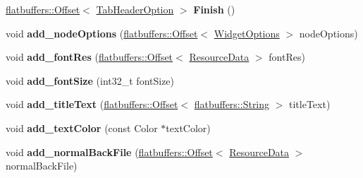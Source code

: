 \begin{DoxyCompactItemize}
\hyperlink{structflatbuffers_1_1Offset}{flatbuffers\+::\+Offset}$<$ \hyperlink{structflatbuffers_1_1TabHeaderOption}{Tab\+Header\+Option} $>$ {\bfseries Finish} ()
\item 
\mbox{\label{structflatbuffers_1_1TabHeaderOptionBuilder_a71c19a789a8634526b654c400526f1ab}} 
void {\bfseries add\+\_\+node\+Options} (\hyperlink{structflatbuffers_1_1Offset}{flatbuffers\+::\+Offset}$<$ \hyperlink{structflatbuffers_1_1WidgetOptions}{Widget\+Options} $>$ node\+Options)
\item 
\mbox{\label{structflatbuffers_1_1TabHeaderOptionBuilder_ab0c86298f95e9cb79e4e2a4505b5f829}} 
void {\bfseries add\+\_\+font\+Res} (\hyperlink{structflatbuffers_1_1Offset}{flatbuffers\+::\+Offset}$<$ \hyperlink{structflatbuffers_1_1ResourceData}{Resource\+Data} $>$ font\+Res)
\item 
\mbox{\label{structflatbuffers_1_1TabHeaderOptionBuilder_a4b58cb26a59ce7f9d7f0a70bcf7fdded}} 
void {\bfseries add\+\_\+font\+Size} (int32\+\_\+t font\+Size)
\item 
\mbox{\label{structflatbuffers_1_1TabHeaderOptionBuilder_aa82f800b7bde0ff70e7e127cf8da6519}} 
void {\bfseries add\+\_\+title\+Text} (\hyperlink{structflatbuffers_1_1Offset}{flatbuffers\+::\+Offset}$<$ \hyperlink{structflatbuffers_1_1String}{flatbuffers\+::\+String} $>$ title\+Text)
\item 
\mbox{\label{structflatbuffers_1_1TabHeaderOptionBuilder_a5ae1520d38fa3195ecd3f2a371371d3c}} 
void {\bfseries add\+\_\+text\+Color} (const Color $\ast$text\+Color)
\item 
\mbox{\label{structflatbuffers_1_1TabHeaderOptionBuilder_a967000479619803a32f74642268cf377}} 
void {\bfseries add\+\_\+normal\+Back\+File} (\hyperlink{structflatbuffers_1_1Offset}{flatbuffers\+::\+Offset}$<$ \hyperlink{structflatbuffers_1_1ResourceData}{Resource\+Data} $>$ normal\+Back\+File)
\item 
\mbox{\label{structflatbuffers_1_1TabHeaderOptionBuilder_a263bfa5a1fd8ca0fb1eaecbaa3a3f049}} 

\end{DoxyCompactItemize}
